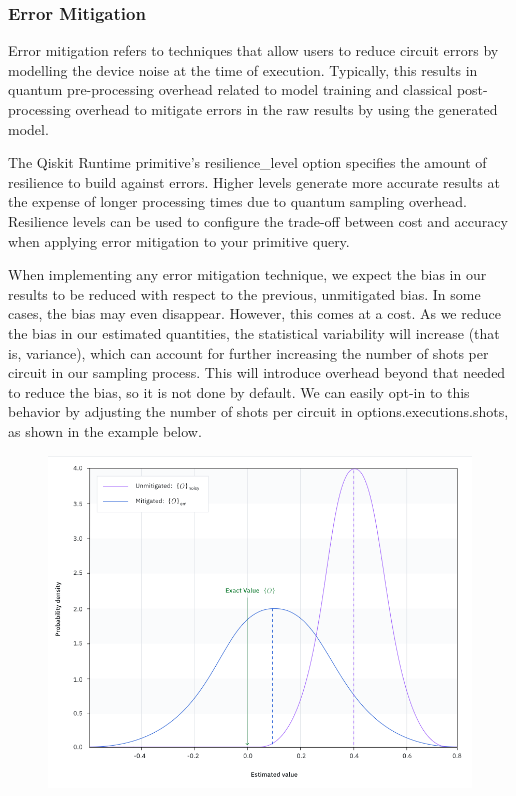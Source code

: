 \documentclass[12pt, oneside]{book}
\theoremstyle{definition}
\theoremstyle{definition}
\theoremstyle{remark}
\begin{document}
\subsubsection{Error Mitigation}
Error mitigation refers to techniques that allow users to reduce circuit errors by modelling the device noise at the time of execution. Typically, this results in quantum pre-processing overhead related to model training and classical post-processing overhead to mitigate errors in the raw results by using the generated model.

The Qiskit Runtime primitive's resilience\_level option specifies the amount of resilience to build against errors. Higher levels generate more accurate results at the expense of longer processing times due  to quantum sampling overhead. Resilience levels can be used to configure the trade-off between cost and accuracy when applying error mitigation to your primitive query.

When implementing any error mitigation technique, we expect the bias in our results to be reduced with respect to the previous, unmitigated bias. In some cases, the bias may even disappear. However, this comes at a cost. As we reduce the bias in our estimated quantities, the statistical variability will increase (that is, variance), which can account for further increasing the number of shots per circuit in our sampling process. This will introduce overhead beyond that needed to reduce the bias, so it is not done by default. We can easily opt-in to this behavior by adjusting the number of shots per circuit in options.executions.shots, as shown in the example below.

\begin{figure}[H]
    \centering
    \includegraphics[width=\linewidth]{../images/error_miti.png}
\end{figure}
\end{document}
